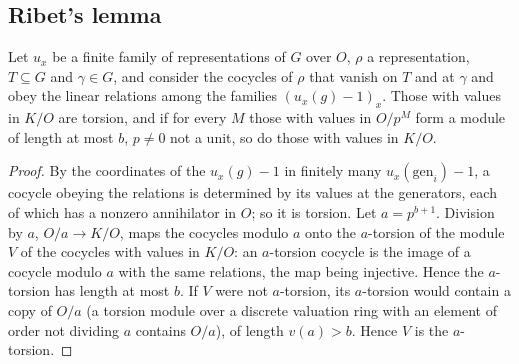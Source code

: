 \subsection{Ribet's lemma}\label{ss:ribet-lemma}

\begin{lemma}\label{lem:divisible-cocycles}
Let $u_x$ be a finite family of representations of $G$ over $O$, $\rho$ a representation, $T\subseteq G$ and $\gamma\in G$, and consider the cocycles of $\rho$ that vanish on $T$ and at $\gamma$ and obey the linear relations among the families
$(u_x(g)-1)_x$. Those with values in $K/O$ are torsion, and if for every $M$ those with values in $O/p^M$ form a module of length at most $b$, $p\ne0$ not a unit, so do those with values in $K/O$.
\end{lemma}

\begin{proof}
By the coordinates of the $u_x(g)-1$ in finitely many $u_x(\mathrm{gen}_i)-1$, a cocycle obeying the relations is determined by its values at the generators, each of which has a nonzero annihilator in $O$; so it is torsion. Let $a=p^{b+1}$.
Division by $a$, $O/a\to K/O$, maps the cocycles modulo $a$ onto the $a$-torsion of the module $V$ of the cocycles with values in $K/O$: an $a$-torsion cocycle is the image of a cocycle modulo $a$ with the same relations, the map being
injective. Hence the $a$-torsion has length at most $b$. If $V$ were not $a$-torsion, its $a$-torsion would contain a copy of $O/a$ (a torsion module over a discrete valuation ring with an element of order not dividing $a$ contains $O/a$),
of length $v(a)>b$. Hence $V$ is the $a$-torsion.
\end{proof}

